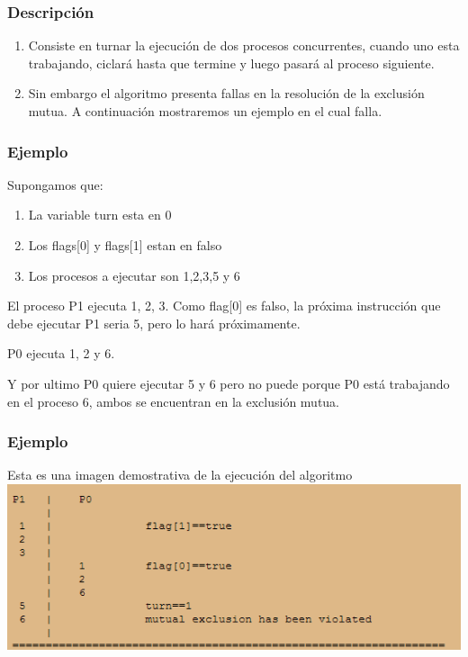 \documentclass{beamer}
\begin{document}
\begin{frame}
\frametitle{Descripción} 
\begin{enumerate}[$*$]
\item Consiste en turnar la ejecución de dos procesos concurrentes, cuando uno esta trabajando, 
ciclará 
hasta que termine y luego pasará al proceso siguiente.
\item Sin embargo el algoritmo presenta fallas en la resolución de la exclusión mutua. A 
continuación 
mostraremos un ejemplo en el cual falla.
\end{enumerate}
\end{frame}


\begin{frame}
\frametitle{Ejemplo} 
Supongamos que:
\begin {enumerate}[$*$]
\item La variable turn esta en 0 
\item Los flags[0] y flags[1] estan en falso
\item Los procesos a ejecutar son 1,2,3,5 y 6
\end{enumerate}
El proceso P1 ejecuta 1, 2, 3. Como flag[0] es falso, la próxima instrucción que debe ejecutar P1 
seria 5, pero lo hará próximamente.\par
P0 ejecuta 1, 2 y 6.\par
Y por ultimo P0 quiere ejecutar 5 y 6 pero no puede porque P0 está trabajando en el proceso 6, ambos 
se encuentran en la exclusión mutua.
\end{frame}

\begin{frame}
\frametitle{Ejemplo} 
Esta es una imagen demostrativa de la ejecución del algoritmo
\includegraphics[width=1\textwidth]{scenario.png}
\end{frame}
\end{document}
